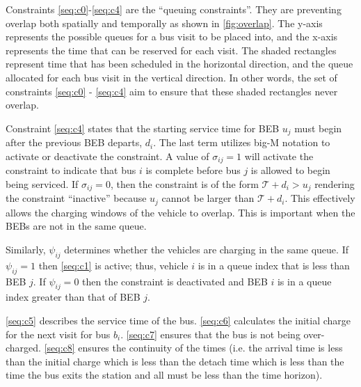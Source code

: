 \documentclass[11pt,a4paper,final]{article}
\newcommand{\T}{\mathcal{T}}                %
\begin{document}
Constraints \ref{seq:c0}-\ref{seq:c4} are the ``queuing constraints''. They are preventing overlap both spatially and
temporally as shown in \ref{fig:overlap}. The y-axis represents the possible queues for a bus visit to be placed into,
and the x-axis represents the time that can be reserved for each visit. The shaded rectangles represent time that has
been scheduled in the horizontal direction, and the queue allocated for each bus visit in the vertical direction. In
other words, the set of constraints \ref{seq:c0} - \ref{seq:c4} aim to ensure that these shaded rectangles never
overlap.

Constraint \ref{seq:c4} states that the starting service time for BEB \(u_j\) must begin after the previous BEB departs,
\(d_i\). The last term utilizes big-M notation to activate or deactivate the constraint. A value of \(\sigma_{ij} = 1\) will
activate the constraint to indicate that bus \(i\) is complete before bus \(j\) is allowed to begin being serviced. If
\(\sigma_{ij} = 0\), then the constraint is of the form \(\T + d_i > u_j\) rendering the constraint ``inactive'' because \(u_j\)
cannot be larger than \(\T + d_i\). This effectively allows the charging windows of the vehicle to overlap. This is
important when the BEBs are not in the same queue.

Similarly, \(\psi_{ij}\) determines whether the vehicles are charging in the same queue. If \(\psi_{ij} = 1\) then \eqref{seq:c1}
is active; thus, vehicle \(i\) is in a queue index that is less than BEB \(j\). If \(\psi_{ij} = 0\) then the constraint is
deactivated and BEB \(i\) is in a queue index greater than that of BEB \(j\).

 \ref{seq:c5} describes the service time of the bus. \ref{seq:c6} calculates the initial charge for the next visit for
bus \(b_i\). \ref{seq:c7} ensures that the bus is not being over-charged. \ref{seq:c8} ensures the continuity of the times
(i.e. the arrival time is less than the initial charge which is less than the detach time which is less than the time
the bus exits the station and all must be less than the time horizon).
\end{document}
